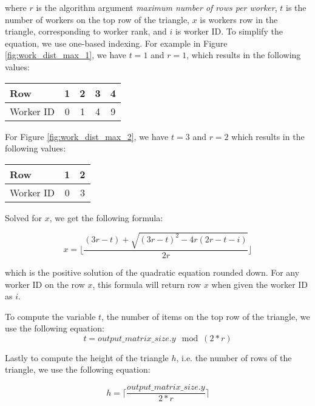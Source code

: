 where $r$ is the algorithm argument \textit{maximum number of rows per worker}, $t$ is the number of workers on the top row of the triangle, $x$ is workers row in the triangle, corresponding to worker rank, and $i$ is worker ID. To simplify the equation, we use one-based indexing. For example in Figure \ref{fig:work_dist_max_1}, we have $t = 1$ and $r = 1$, which results in the following values:


\begin{center}
	\begin{tabular}{|l|c|c|c|c|} 
		\hline
		Row&1&2&3&4\\
		\hline
		Worker ID&0&1&4&9\\
		\hline
	\end{tabular}
\end{center}


For Figure \ref{fig:work_dist_max_2}, we have $t = 3$ and $r = 2$ which results in the following values:

\begin{center}
	\begin{tabular}{|l|c|c|} 
		\hline
		Row&1&2\\
		\hline
		Worker ID&0&3\\
		\hline
	\end{tabular}
\end{center}


Solved for $x$, we get the following formula:

\begin{equation}
\label{eq:row_computation}
	x = \lfloor \frac{(3r - t) + \sqrt{(3r - t)^2 - 4r(2r - t - i)}}{2r} \rfloor
\end{equation}

which is the positive solution of the quadratic equation rounded down. For any worker ID on the row $x$, this formula will return row $x$ when given the worker ID as $i$.

To compute the variable $t$, the number of items on the top row of the triangle, we use the following equation:
\begin{equation}
	t = output\_matrix\_size.y \mod (2*r)
\end{equation}

Lastly to compute the height of the triangle $h$, i.e. the number of rows of the triangle, we use the following equation:

\begin{equation}
	h = \lceil\frac{output\_matrix\_size.y}{2*r}\rceil
\end{equation}

